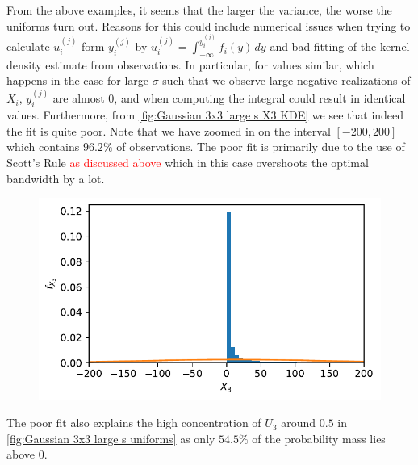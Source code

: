 \documentclass[../Thesis.tex]{subfiles}
\begin{document}
From the above examples, it seems that the larger the variance, the worse the uniforms turn out. Reasons for this could include numerical issues when trying to calculate $u_i^{(j)}$ form $y_i^{(j)}$ by $u_i^{(j)} = \int_{-\infty}^{y_i^{(j)}} f_i(y) \, dy$ and bad fitting of the kernel density estimate from observations. In particular, for values similar, which happens in the case for large $\sigma$ such that we observe large negative realizations of $X_i$, $y_i^{(j)}$ are almost 0, and when computing the integral could result in identical values. Furthermore, from \autoref{fig:Gaussian 3x3 large s X3 KDE} we see that indeed the fit is quite poor. Note that we have zoomed in on the interval $[-200 , 200]$ which contains $96.2\%$ of observations. The poor fit is primarily due to the use of Scott's Rule \textcolor{red}{as discussed above} which in this case overshoots the optimal bandwidth by a lot.
\begin{figure}[H]
    \centering
    \includegraphics[width=0.7\linewidth]{figures/ND examples/Gaussian 3x3 large s X3 KDE.pdf}
    \caption{}
    \label{fig:Gaussian 3x3 large s X3 KDE}
\end{figure}
The poor fit also explains the high concentration of $U_3$ around $0.5$ in \autoref{fig:Gaussian 3x3 large s uniforms} as only $54.5\%$ of the probability mass lies above $0$.
\end{document}
